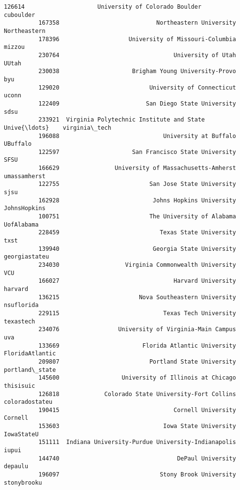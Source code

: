 \documentclass[11pt]{article}
\begin{document}
\begin{Verbatim}[commandchars=\\\{\}]
          126614                     University of Colorado Boulder        cuboulder   
          167358                            Northeastern University     Northeastern   
          178396                    University of Missouri-Columbia           mizzou   
          230764                                 University of Utah            UUtah   
          230038                     Brigham Young University-Provo              byu   
          129020                          University of Connecticut            uconn   
          122409                         San Diego State University             sdsu   
          233921  Virginia Polytechnic Institute and State Unive{\ldots}    virginia\_tech   
          196088                              University at Buffalo         UBuffalo   
          122597                     San Francisco State University             SFSU   
          166629                University of Massachusetts-Amherst     umassamherst   
          122755                          San Jose State University             sjsu   
          162928                           Johns Hopkins University     JohnsHopkins   
          100751                          The University of Alabama       UofAlabama   
          228459                             Texas State University             txst   
          139940                           Georgia State University    georgiastateu   
          234030                   Virginia Commonwealth University              VCU   
          166027                                 Harvard University          harvard   
          136215                       Nova Southeastern University       nsuflorida   
          229115                              Texas Tech University        texastech   
          234076                 University of Virginia-Main Campus              uva   
          133669                        Florida Atlantic University  FloridaAtlantic   
          209807                          Portland State University   portland\_state   
          145600                  University of Illinois at Chicago        thisisuic   
          126818             Colorado State University-Fort Collins   coloradostateu   
          190415                                 Cornell University          Cornell   
          153603                              Iowa State University       IowaStateU   
          151111  Indiana University-Purdue University-Indianapolis            iupui   
          144740                                  DePaul University          depaulu   
          196097                             Stony Brook University      stonybrooku   

\end{Verbatim}
\end{document}
